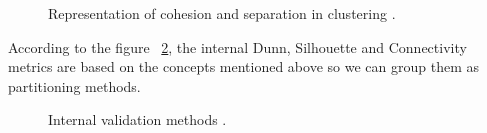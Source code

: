 \begin{figure}[htbp]
  \centering
    \caption{Representation of cohesion and separation in clustering \citep{b54}.}%
    \label{fig:cohesion}%
\end{figure}

According to the figure ~\ref{fig:internal}, the internal Dunn, Silhouette and Connectivity metrics are based on the concepts mentioned above so we can group them as partitioning methods.

\begin{figure}[htbp]
  \centering
    \caption{Internal validation methods \citep{b54}.}%
    \label{fig:internal}%
\end{figure}

